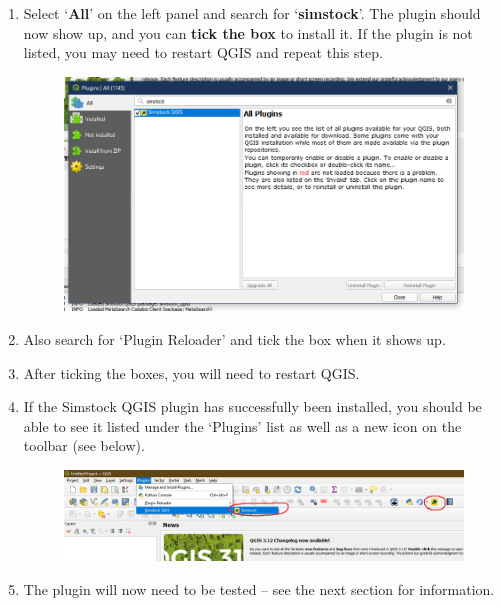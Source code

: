 \documentclass{article}
\begin{document}
\begin{enumerate}
    \item Select `\textbf{All}' on the left panel and search for `\textbf{simstock}'. The plugin should now show up, and you can \textbf{tick the box} to install it. If the plugin is not listed, you may need to restart QGIS and repeat this step.
    \begin{figure}[h!]
        \centering
        \includegraphics[width=14cm]{tick-simstock.png}
        \label{fig:tick_simstock}
    \end{figure}
    
    \item Also search for `Plugin Reloader' and tick the box when it shows up.
    
    \item After ticking the boxes, you will need to restart QGIS.
    
    \item If the Simstock QGIS plugin has successfully been installed, you should be able to see it listed under the `Plugins' list as well as a new icon on the toolbar (see below).
    \begin{figure}[h!]
        \centering
        \includegraphics[width=16cm]{installed.png}
        \label{fig:installed}
    \end{figure}
    
    \item The plugin will now need to be tested -- see the next section for information.
\end{enumerate}
\end{document}
